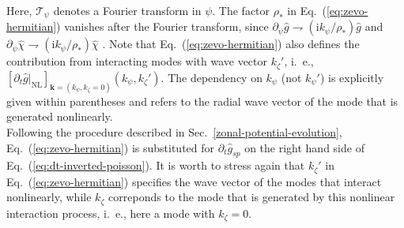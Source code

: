 Here, $\mathcal{T}_\psi$ denotes a Fourier transform in $\psi$. 
The factor $\rho_\ast$ in Eq.~(\ref{eq:zevo-hermitian}) vanishes after the Fourier transform, since $\partial_\psi \hat{g} \rightharpoondown (\mathrm{i} k_\psi /\rho_\ast) \hat{g}$ and $\partial_\psi \hat{\chi} \rightharpoondown (\mathrm{i} k_\psi /\rho_\ast) \hat{\chi}$ . 
Note that Eq.~(\ref{eq:zevo-hermitian}) also defines the contribution from interacting modes with wave vector $k_\zeta'$, i.~e., $[\partial_t \hat g |_\mathrm{NL}]_{\mathbf{k}=(k_\psi,k_\zeta=0)}  (k_\psi,k_\zeta')$.
The dependency on $k_\psi$ (not $k_\psi'$) is explicitly given within parentheses and refers to the radial wave vector of the mode that is generated nonlinearly. \\
Following the procedure described in Sec.~\ref{zonal-potential-evolution}, Eq.~(\ref{eq:zevo-hermitian}) is substituted for $\partial_t \hat g_{sp}$ on the right hand side of Eq.~(\ref{eq:dt-inverted-poisson}).
It is worth to stress again that $k_\zeta'$ in Eq.~(\ref{eq:zevo-hermitian}) specifies the wave vector of the modes that interact nonlinearly, while $k_\zeta$ correponds to the mode that is generated by this nonlinear interaction process, i.~e., here a mode with $k_\zeta = 0$. 

    
    

